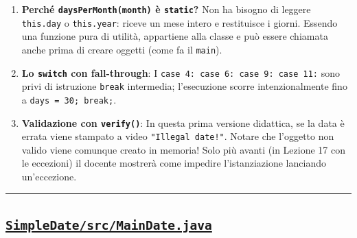 \documentclass[11pt,a4paper,oneside]{report}
\newcommand{\passthrough}[1]{#1}
\providecommand{\tightlist}{\setlength{\itemsep}{0pt}\setlength{\parskip}{0pt}}
\begin{document}
\begin{enumerate}
\def\labelenumi{\arabic{enumi}.}
\tightlist
\item
  \textbf{Perché \passthrough{\lstinline!daysPerMonth(month)!} è
  \passthrough{\lstinline!static!}?} Non ha bisogno di leggere
  \passthrough{\lstinline!this.day!} o
  \passthrough{\lstinline!this.year!}: riceve un mese intero e
  restituisce i giorni. Essendo una funzione pura di utilità, appartiene
  alla classe e può essere chiamata anche prima di creare oggetti (come
  fa il \passthrough{\lstinline!main!}).
\item
  \textbf{Lo \passthrough{\lstinline!switch!} con fall-through}: I
  \passthrough{\lstinline!case 4: case 6: case 9: case 11:!} sono privi
  di istruzione \passthrough{\lstinline!break!} intermedia; l'esecuzione
  scorre intenzionalmente fino a
  \passthrough{\lstinline!days = 30; break;!}.
\item
  \textbf{Validazione con \passthrough{\lstinline!verify()!}}: In questa
  prima versione didattica, se la data è errata viene stampato a video
  \passthrough{\lstinline'"Illegal date!"'}. Notare che l'oggetto non
  valido viene comunque creato in memoria! Solo più avanti (in Lezione
  17 con le eccezioni) il docente mostrerà come impedire l'istanziazione
  lanciando un'eccezione.
\end{enumerate}

\begin{center}\rule{0.5\linewidth}{0.5pt}\end{center}

\subsection{\texorpdfstring{\href{file:///home/wally/Documenti/GitHub/Programmazione-II/25-26/Teoria-e-Esercitazioni/Codice-20260902/Lezioni05-06/SimpleDate/src/MainDate.java}{\texttt{SimpleDate/src/MainDate.java}}}{SimpleDate/src/MainDate.java}}\label{chap05_simpledatesrcmaindate.java}
\end{document}
